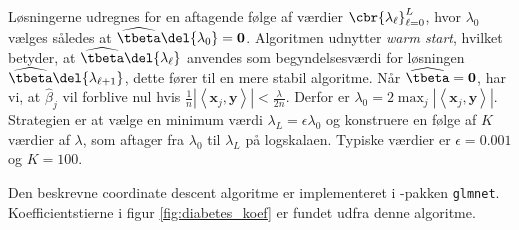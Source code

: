 %
Løsningerne udregnes for en aftagende følge af værdier \(\cbr{\lambda_{\ell}}_{\ell = 0}^L\), hvor \(\lambda_0\) vælges således at \(\widehat{\tbeta} \del{\lambda_0} =\mathbf{0}\). 
Algoritmen udnytter \textit{warm start}, hvilket betyder, at \(\widehat{\tbeta} \del{\lambda_\ell}\) anvendes som begyndelsesværdi for løsningen \(\widehat{\tbeta} \del{\lambda_{\ell + 1}}\), dette fører til en mere stabil algoritme. 
Når \(\widehat{\tbeta} = \mathbf{0}\), har vi, at \(\widehat{\beta}_j\) vil forblive nul hvis \(\frac{1}{n} \left\vert \left\langle \mathbf{x}_j, \mathbf{y} \right\rangle \right\vert < \frac{\lambda}{2n}\). Derfor er \( \lambda_0 = 2 \max_j \left\vert \left\langle \mathbf{x}_j, \mathbf{y} \right\rangle \right\vert\).
Strategien er at vælge en minimum værdi \(\lambda_L = \epsilon \lambda_0\) og konstruere en følge af \(K\) værdier af \(\lambda\), som aftager fra \(\lambda_0\) til \(\lambda_L\) på logskalaen.
Typiske værdier er \(\epsilon = 0.001\) og \(K =100\).

Den beskrevne coordinate descent algoritme er implementeret i \Rlang-pakken \texttt{glmnet}.
Koefficientstierne i figur \ref{fig:diabetes_koef} er fundet udfra denne algoritme.
